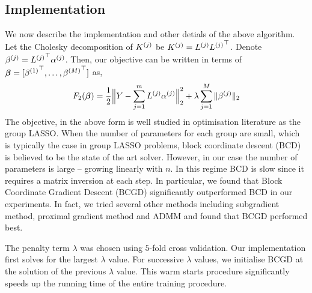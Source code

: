 \subsection{Implementation}

We now describe the implementation and other detials of the above algorithm.
Let the Cholesky decomposition of ${K^{(j)}}$ be ${K^{(j)}} = {L^{(j)}} {L^{(j)}}^\top$. 
Denote ${\beta^{(j)}} = {L^{(j)}}^\top {\alpha^{(j)}}$.
Then, our objective can be written in terms of ${\bm{\beta}} = [{\beta^{(1)}}^\top,
\dots, {\beta^{(M)}}^\top]$ as,
\begin{equation}
F_2({\bm{\beta}}) =  \frac{1}{2}\Big\|Y - \sum_{j=1}^m {L^{(j)}} {\alpha^{(j)}}\Big\|_2^2 + 
  \lambda \sum_{j=1}^M \|{\beta^{(j)}}\|_2
\end{equation}
The objective, in the above form is well studied in optimisation literature as the group
LASSO. 
When the number of parameters for each group are small, which is
typically the case in group LASSO problems, block coordinate descent (BCD) is believed
to be the state of the art solver. However, in our case the number of parameters
is large -- growing linearly with $n$. In this regime BCD is slow since it
requires a matrix inversion at each step. In particular, we found that Block
Coordinate Gradient Descent (BCGD) significantly outperformed BCD in our
experiments. 
In fact, we tried several other methods including subgradient method, proximal
gradient method and ADMM and found that BCGD performed best.

The penalty term $\lambda$ was chosen using $5$-fold cross validation. Our implementation
first solves for the largest $\lambda$ value. For successive $\lambda$
values, we initialise BCGD at the solution of the previous $\lambda$ value. This
warm starts procedure significantly speeds up the running time of the entire
training procedure.

